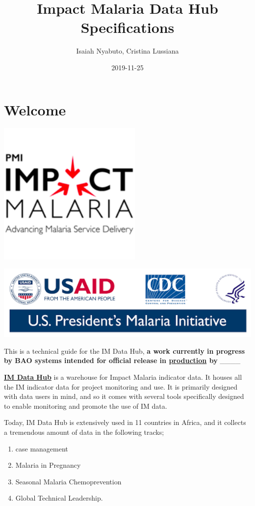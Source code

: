 \documentclass[]{book}
\title{Impact Malaria Data Hub Specifications}
\author{Isaiah Nyabuto, Cristina Lussiana}
\date{2019-11-25}
\providecommand{\tightlist}{%
  \setlength{\itemsep}{0pt}\setlength{\parskip}{0pt}}
\begin{document}
\maketitle

{
\setcounter{tocdepth}{1}
\tableofcontents
}
\hypertarget{welcome}{%
\chapter*{Welcome}\label{welcome}}

\includegraphics[width=2.78in]{./images/logo1}

\includegraphics[width=5.93in]{./images/logo2}

This is a technical guide for the IM Data Hub, \textbf{a work currently in progress by BAO systems intended for official release in \href{imdatahub.org}{production} by }\_\_\_\_

\href{imdatahub.org}{\textbf{IM Data Hub}} is a warehouse for Impact Malaria indicator data. It houses all the IM indicator data for project monitoring and use. It is primarily designed with data users in mind, and so it comes with several tools specifically designed to enable monitoring and promote the use of IM data.

Today, IM Data Hub is extensively used in 11 countries in Africa, and it collects a tremendous amount of data in the following tracks;

\begin{enumerate}
\def\labelenumi{\arabic{enumi}.}
\tightlist
\item
  case management
\item
  Malaria in Pregnancy
\item
  Seasonal Malaria Chemoprevention
\item
  Global Technical Leadership.
\end{enumerate}
\end{document}
